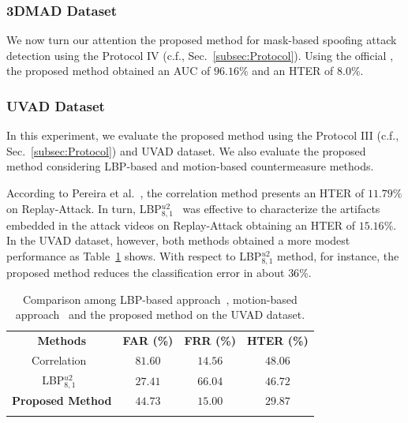 \subsubsection{3DMAD Dataset}\label{subsec:3dmad_results}
We now turn our attention  the proposed method for mask-based spoofing attack detection {using the Protocol IV (c.f., Sec.~\ref{subsec:Protocol})}. Using the official , the proposed method obtained an AUC of $96.16\%$ and an HTER of $8.0\%$.



\subsubsection{UVAD Dataset}\label{subsec:uvad_results}
In this experiment, we evaluate the proposed method using the Protocol III (c.f., Sec.~\ref{subsec:Protocol}) and UVAD dataset. We also evaluate the proposed method considering LBP-based and motion-based countermeasure methods. 

According to Pereira et al.~\cite{Pereira:ICB:2013}, the correlation method presents an HTER of $11.79\%$ on Replay-Attack. {In turn,} LBP$_{8,1}^{u2}$~\cite{Chingovska:BIOSEG:2012} was effective to characterize the artifacts embedded in the attack videos on Replay-Attack obtaining an HTER of $15.16\%$. In the UVAD dataset, however, both methods obtained a more modest performance as Table~\ref{tab:antispoofing_uvad} shows. With respect to LBP$_{8,1}^{u2}$ method, for instance, the proposed method reduces the classification error in about $36\%$.
%
\begin{table}[!ht]
	\centering
	\caption{Comparison among LBP-based approach~\cite{Chingovska:BIOSEG:2012}, motion-based approach~\cite{Anjos:IJCB:2011} and the proposed method on the UVAD dataset.}
	\label{tab:antispoofing_uvad}
	\begin{tabular}{cccc}
		\topline
		\headcol \textbf{Methods}                         & \textbf{FAR (\%)} & \textbf{FRR (\%)} & \textbf{HTER (\%)} \\ 
		\midline
		Correlation~\cite{Anjos:IJCB:2011}				  & $81.60$ & $14.56$ & $48.06$ \\
		\rowcol LBP$_{8,1}^{u2}$~\cite{Chingovska:BIOSEG:2012}    & $27.41$ & $66.04$ & $46.72$ \\
		\textbf{Proposed Method} & $\mathbf{44.73}$ & $\mathbf{15.00}$ & $\mathbf{29.87}$ \\
		\bottomline		
	\end{tabular}
\end{table}


